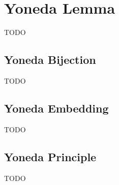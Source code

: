 \section{Yoneda Lemma}
TODO

\subsection{Yoneda Bijection}
TODO

\subsection{Yoneda Embedding}
TODO

\subsection{Yoneda Principle}
TODO
